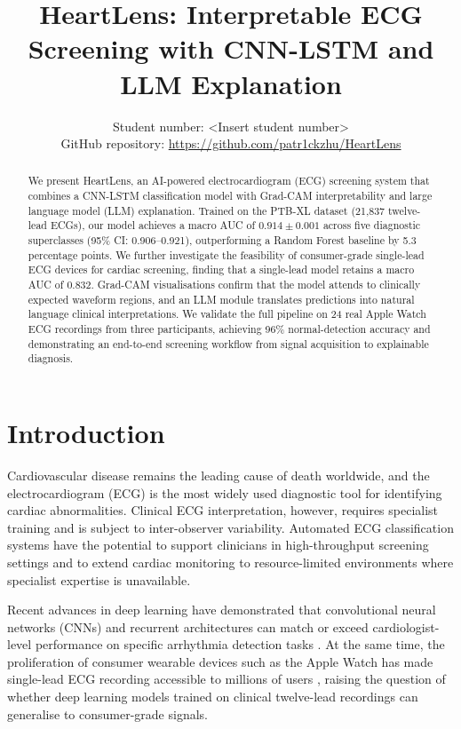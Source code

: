 \documentclass[10pt]{article}
\title{HeartLens: Interpretable ECG Screening with CNN-LSTM and LLM Explanation}
\author{\name Student number: <Insert student number> \\
      \addr GitHub repository: \url{https://github.com/patr1ckzhu/HeartLens}
      }
\begin{document}
\maketitle

\begin{abstract}
We present HeartLens, an AI-powered electrocardiogram (ECG) screening system that combines a CNN-LSTM classification model with Grad-CAM interpretability and large language model (LLM) explanation. Trained on the PTB-XL dataset (21,837 twelve-lead ECGs), our model achieves a macro AUC of $0.914 \pm 0.001$ across five diagnostic superclasses (95\% CI: 0.906--0.921), outperforming a Random Forest baseline by 5.3 percentage points. We further investigate the feasibility of consumer-grade single-lead ECG devices for cardiac screening, finding that a single-lead model retains a macro AUC of 0.832. Grad-CAM visualisations confirm that the model attends to clinically expected waveform regions, and an LLM module translates predictions into natural language clinical interpretations. We validate the full pipeline on 24 real Apple Watch ECG recordings from three participants, achieving 96\% normal-detection accuracy and demonstrating an end-to-end screening workflow from signal acquisition to explainable diagnosis.
\end{abstract}

\section{Introduction}

Cardiovascular disease remains the leading cause of death worldwide, and the electrocardiogram (ECG) is the most widely used diagnostic tool for identifying cardiac abnormalities. Clinical ECG interpretation, however, requires specialist training and is subject to inter-observer variability. Automated ECG classification systems have the potential to support clinicians in high-throughput screening settings and to extend cardiac monitoring to resource-limited environments where specialist expertise is unavailable.

Recent advances in deep learning have demonstrated that convolutional neural networks (CNNs) and recurrent architectures can match or exceed cardiologist-level performance on specific arrhythmia detection tasks \citep{hannun2019cardiologist, ribeiro2020ecg}. At the same time, the proliferation of consumer wearable devices such as the Apple Watch has made single-lead ECG recording accessible to millions of users \citep{perez2021apple}, raising the question of whether deep learning models trained on clinical twelve-lead recordings can generalise to consumer-grade signals.
\end{document}
